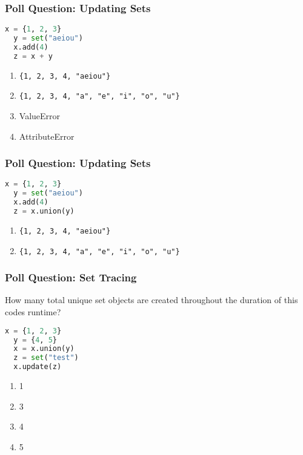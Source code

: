 \documentclass{beamer}
\begin{document}
%
%
\begin{frame}[fragile]
  \frametitle{Poll Question: Updating Sets}
  \begin{lstlisting}[language=Python, autogobble]
  x = {1, 2, 3}
  y = set("aeiou")
  x.add(4)
  z = x + y
  \end{lstlisting}
  \vfill
  \begin{enumerate}[A] 
    \item \lstinline|{1, 2, 3, 4, "aeiou"}|
    \item \lstinline|{1, 2, 3, 4, "a", "e", "i", "o", "u"}|
    \item ValueError
    \item AttributeError
  \end{enumerate}
\end{frame}

%
%
\begin{frame}[fragile]
  \frametitle{Poll Question: Updating Sets}
  \begin{lstlisting}[language=Python, autogobble]
  x = {1, 2, 3}
  y = set("aeiou")
  x.add(4)
  z = x.union(y)
  \end{lstlisting}
  \vfill
  \begin{enumerate}[A] 
    \item \lstinline|{1, 2, 3, 4, "aeiou"}|
    \item \lstinline|{1, 2, 3, 4, "a", "e", "i", "o", "u"}|
  \end{enumerate}
\end{frame}

%
%
\begin{frame}[fragile]
  \frametitle{Poll Question: Set Tracing}
  How many total unique set objects are created throughout the duration of this
  codes runtime?
  \begin{lstlisting}[language=Python, autogobble]
  x = {1, 2, 3}
  y = {4, 5}
  x = x.union(y)
  z = set("test")
  x.update(z)
  \end{lstlisting}
  \vfill
  \begin{enumerate}[A] 
    \item 1
    \item 3
    \item 4
    \item 5
  \end{enumerate}
\end{frame}
\end{document}
